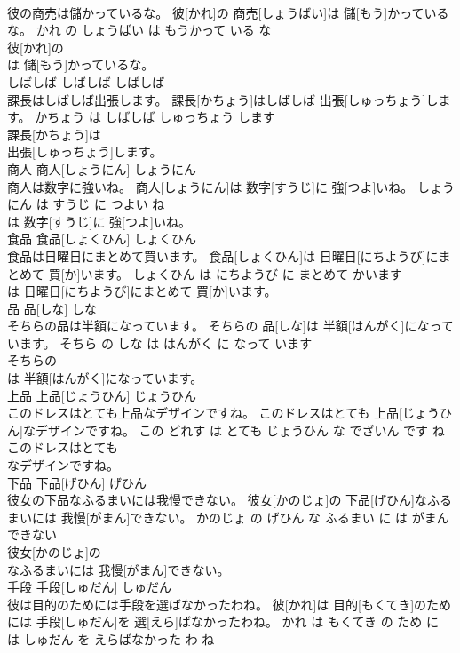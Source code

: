 \documentclass[8pt]{extreport}
\begin{document}
\begin{CJK}{UTF8}{min}
\\	彼の商売は儲かっているな。	彼[かれ]の 商売[しょうばい]は 儲[もう]かっているな。	かれ の しょうばい は もうかって いる な	
\\	彼[かれ]の
\\	は 儲[もう]かっているな。			
\\	しばしば	しばしば	しばしば	
\\	課長はしばしば出張します。	課長[かちょう]はしばしば 出張[しゅっちょう]します。	かちょう は しばしば しゅっちょう します	
\\	課長[かちょう]は
\\	出張[しゅっちょう]します。			
\\	商人	商人[しょうにん]	しょうにん	
\\	商人は数字に強いね。	商人[しょうにん]は 数字[すうじ]に 強[つよ]いね。	しょうにん は すうじ に つよい ね	
\\	は 数字[すうじ]に 強[つよ]いね。			
\\	食品	食品[しょくひん]	しょくひん	
\\	食品は日曜日にまとめて買います。	食品[しょくひん]は 日曜日[にちようび]にまとめて 買[か]います。	しょくひん は にちようび に まとめて かいます	
\\	は 日曜日[にちようび]にまとめて 買[か]います。			
\\	品	品[しな]	しな	
\\	そちらの品は半額になっています。	そちらの 品[しな]は 半額[はんがく]になっています。	そちら の しな は はんがく に なって います	
\\	そちらの
\\	は 半額[はんがく]になっています。			
\\	上品	上品[じょうひん]	じょうひん	
\\	このドレスはとても上品なデザインですね。	このドレスはとても 上品[じょうひん]なデザインですね。	この どれす は とても じょうひん な でざいん です ね	
\\	このドレスはとても
\\	なデザインですね。			
\\	下品	下品[げひん]	げひん	
\\	彼女の下品なふるまいには我慢できない。	彼女[かのじょ]の 下品[げひん]なふるまいには 我慢[がまん]できない。	かのじょ の げひん な ふるまい に は がまん できない	
\\	彼女[かのじょ]の
\\	なふるまいには 我慢[がまん]できない。			
\\	手段	手段[しゅだん]	しゅだん	
\\	彼は目的のためには手段を選ばなかったわね。	彼[かれ]は 目的[もくてき]のためには 手段[しゅだん]を 選[えら]ばなかったわね。	かれ は もくてき の ため に は しゅだん を えらばなかった わ ね	

\end{CJK}
\end{document}
